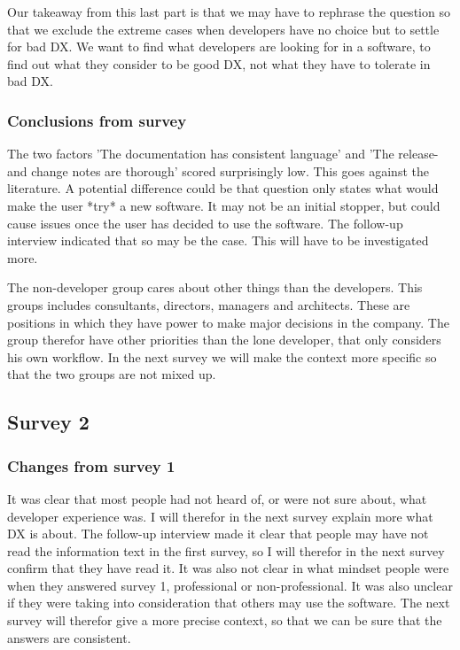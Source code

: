 \documentclass{article}
\begin{document}
Our takeaway from this last part is that we may have to rephrase the
question so that we exclude the extreme cases when developers have no
choice but to settle for bad DX. We want to find what developers are
looking for in a software, to find out what they consider to be good DX,
not what they have to tolerate in bad DX.

\subsubsection{Conclusions from survey}

The two factors 'The documentation has consistent language' and 'The
release- and change notes are thorough' scored surprisingly low. This
goes against the literature. A potential difference could be that
question only states what would make the user *try* a new software. It
may not be an initial stopper, but could cause issues once the user has
decided to use the software. The follow-up interview indicated that so
may be the case. This will have to be investigated more.

The non-developer group cares about other things than the developers.
This groups includes consultants, directors, managers and architects.
These are positions in which they have power to make major decisions in
the company. The group therefor have other priorities than the lone
developer, that only considers his own workflow. In the next survey we
will make the context more specific so that the two groups are not mixed
up.

\subsection{Survey 2}

\subsubsection{Changes from survey 1}

It was clear that most people had not heard of, or were not sure about,
what developer experience was. I will therefor in the next survey
explain more what DX is about. The follow-up interview made it clear
that people may have not read the information text in the first survey,
so I will therefor in the next survey confirm that they have read it. It
was also not clear in what mindset people were when they answered survey
1, professional or non-professional. It was also unclear if they were
taking into consideration that others may use the software. The next
survey will therefor give a more precise context, so that we can be sure
that the answers are consistent.
\end{document}
